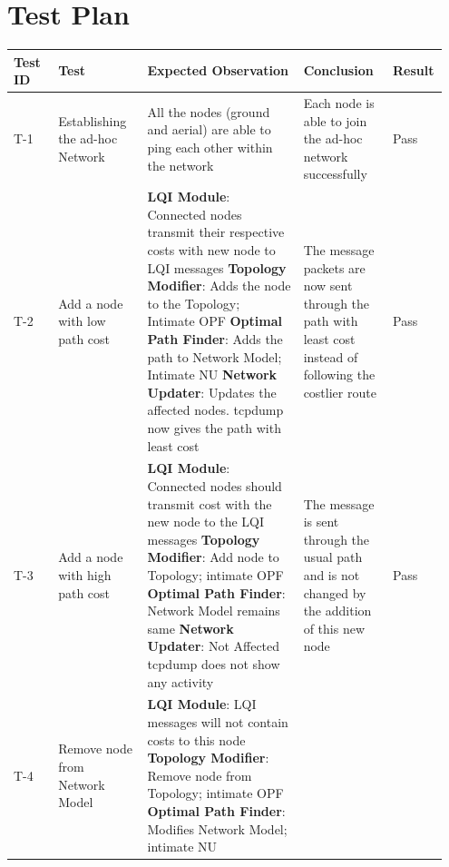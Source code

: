 \documentclass{article}
\begin{document}
\section{Test Plan}
{\renewcommand{\arraystretch}{1.5}
\begin{longtable}{  | p{0.1\linewidth} | p{0.2\linewidth} | p{0.35\linewidth} | p{0.2\linewidth} | p{0.1\linewidth} | }
\hline
\textbf{Test ID} & \textbf{Test} & \textbf{Expected Observation} & \textbf{Conclusion} & \textbf{Result} \\ 
\hline \hline
T-1 & Establishing the ad-hoc Network & All the nodes (ground and aerial) are able to ping each other within the network
& Each node is able to join the ad-hoc network successfully & Pass \\
\hline
T-2 & 
Add a node with low path cost & 
\textbf{LQI Module}: Connected nodes transmit their respective costs with new node to LQI messages \newline 
\textbf{Topology Modifier}: Adds the node to the Topology; Intimate OPF \newline 
\textbf{Optimal Path Finder}: Adds the path to Network Model; Intimate NU \newline
\textbf{Network Updater}: Updates the affected nodes. \newline
tcpdump now gives the path with least cost & 
The message packets are now sent through the path with least cost instead of following the costlier route &
Pass \\
\hline
T-3 & 
Add a node with high path cost & 
\textbf{LQI Module}: Connected nodes should transmit cost with the new node to the LQI messages\newline 
\textbf{Topology Modifier}: Add node to Topology; intimate OPF\newline 
\textbf{Optimal Path Finder}: Network Model remains same\newline
\textbf{Network Updater}: Not Affected \newline
tcpdump does not show any activity &
The message is sent through the usual path and is not changed by the addition of this new node &
Pass\\
\hline
T-4 & 
Remove node from Network Model & 
\textbf{LQI Module}: LQI messages will not contain costs to this node\newline 
\textbf{Topology Modifier}: Remove node from Topology; intimate OPF \newline 
\textbf{Optimal Path Finder}: Modifies Network Model; intimate NU \newline

\end{longtable}}
\end{document}
